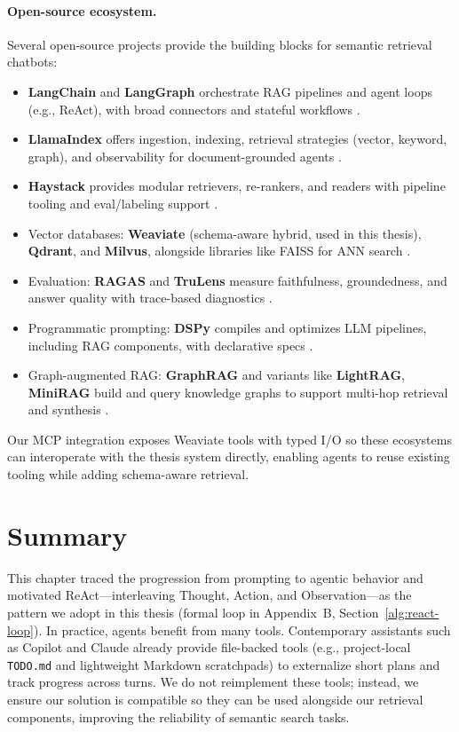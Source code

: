 \paragraph{Open-source ecosystem.} Several open-source projects provide the building blocks for semantic retrieval chatbots:
\begin{itemize}
    \item \textbf{LangChain} and \textbf{LangGraph} orchestrate RAG pipelines and agent loops (e.g., ReAct), with broad connectors and stateful workflows \cite{langchain,langgraph}.
    \item \textbf{LlamaIndex} offers ingestion, indexing, retrieval strategies (vector, keyword, graph), and observability for document-grounded agents \cite{llamaindex}.
    \item \textbf{Haystack} provides modular retrievers, re-rankers, and readers with pipeline tooling and eval/labeling support \cite{haystack}.
    \item Vector databases: \textbf{Weaviate} (schema-aware hybrid, used in this thesis), \textbf{Qdrant}, and \textbf{Milvus}, alongside libraries like FAISS for ANN search \cite{weaviate,qdrant,milvus,douze2024faiss}.
    \item Evaluation: \textbf{RAGAS} and \textbf{TruLens} measure faithfulness, groundedness, and answer quality with trace-based diagnostics \cite{ragas,trulens}.
    \item Programmatic prompting: \textbf{DSPy} compiles and optimizes LLM pipelines, including RAG components, with declarative specs \cite{dspy}.
    \item Graph-augmented RAG: \textbf{GraphRAG} and variants like \textbf{LightRAG}, \textbf{MiniRAG} build and query knowledge graphs to support multi-hop retrieval and synthesis \cite{graphrag}.
\end{itemize}

Our MCP integration exposes Weaviate tools with typed I/O so these ecosystems can interoperate with the thesis system directly, enabling agents to reuse existing tooling while adding schema-aware retrieval.

\section{Summary}
This chapter traced the progression from prompting to agentic behavior and motivated ReAct—interleaving Thought, Action, and Observation—as the pattern we adopt in this thesis (formal loop in Appendix~B, Section~\ref{alg:react-loop}). In practice, agents benefit from many tools. Contemporary assistants such as Copilot and Claude already provide file-backed tools (e.g., project-local \texttt{TODO.md} and lightweight Markdown scratchpads) to externalize short plans and track progress across turns. We do not reimplement these tools; instead, we ensure our solution is compatible so they can be used alongside our retrieval components, improving the reliability of semantic search tasks.

